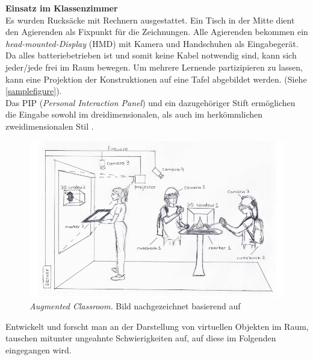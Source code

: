 \documentclass[deutsch]{llncs}
\begin{document}
\noindent \textbf{Einsatz im Klassenzimmer} \\
Es wurden Rucksäcke mit Rechnern ausgestattet. Ein Tisch in der Mitte dient den Agierenden als Fixpunkt für die Zeichnungen. Alle Agierenden bekommen ein \emph{head-mounted-Display} (HMD) mit Kamera und Handschuhen als Eingabegerät. Da alles batteriebetrieben ist und somit keine Kabel notwendig sind, kann sich jeder/jede frei im Raum bewegen. 
Um mehrere Lernende partizipieren zu lassen, kann eine Projektion der Konstruktionen auf eine Tafel abgebildet werden. (Siehe \autoref{samplefigure}). \\
Das PIP (\emph{Personal Interaction Panel}) und ein dazugehöriger Stift ermöglichen die Eingabe sowohl im dreidimensionalen, als auch im herkömmlichen zweidimensionalen Stil \cite{1667626}. 

\begin{figure}[h]
	\centering
	\includegraphics[width=1\textwidth]{figures/classroom}
	\caption{\emph{Augmented Classroom.} Bild nachgezeichnet basierend auf \cite{Kaufmann:2002:MGE:1242073.1242086} }
	\label{fig:samplefigure}
\end{figure}

\noindent Entwickelt und forscht man an der Darstellung von virtuellen Objekten im Raum, tauschen mitunter ungeahnte Schwierigkeiten auf, auf diese im Folgenden eingegangen wird.
\end{document}
